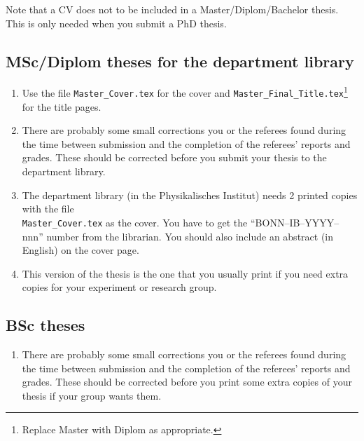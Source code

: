 Note that a CV does not to be included in a Master/Diplom/Bachelor
thesis. This is only needed when you submit a PhD thesis.


\subsection{MSc/Diplom theses for the department library}

\begin{enumerate}
\item Use the file \texttt{Master\_Cover.tex} for the cover and
  \texttt{Master\_Final\_Title.tex}\footnote{Replace Master with Diplom
    as appropriate.} for the title pages.
\item There are probably some small corrections you or the referees
  found during the time between submission and the completion of the
  referees' reports and grades. These should be corrected before you
  submit your thesis to the department library.
\item The department
  library (in the Physikalisches
  Institut) needs 2 printed copies with the file\\
  \texttt{Master\_Cover.tex} as the cover. You have to get
  the \enquote{BONN--IB--YYYY--nnn} number from the librarian. You
  should also include an abstract (in English) on the cover page.
\item This version of the thesis is the one that you usually print if
  you need extra copies for your experiment or research group.
\end{enumerate}


\subsection{BSc theses}

\begin{enumerate}
\item There are probably some small corrections you or the referees
  found during the time between submission and the completion of the
  referees' reports and grades. These should be corrected before you
  print some extra copies of your thesis if your group wants them.
\end{enumerate}

